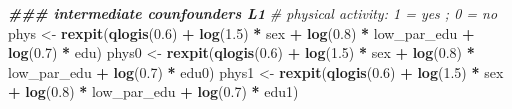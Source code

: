 \documentclass[
]{book}
\newenvironment{Shaded}{\begin{snugshade}}{\end{snugshade}}
\newcommand{\CommentTok}[1]{\textcolor[rgb]{0.56,0.35,0.01}{\textit{#1}}}
\newcommand{\DocumentationTok}[1]{\textcolor[rgb]{0.56,0.35,0.01}{\textbf{\textit{#1}}}}
\newcommand{\FloatTok}[1]{\textcolor[rgb]{0.00,0.00,0.81}{#1}}
\newcommand{\FunctionTok}[1]{\textcolor[rgb]{0.13,0.29,0.53}{\textbf{#1}}}
\newcommand{\NormalTok}[1]{#1}
\newcommand{\OtherTok}[1]{\textcolor[rgb]{0.56,0.35,0.01}{#1}}
\newcommand{\SpecialCharTok}[1]{\textcolor[rgb]{0.81,0.36,0.00}{\textbf{#1}}}
\begin{document}
\begin{Shaded}
\begin{Highlighting}[]
  \DocumentationTok{\#\#\# intermediate counfounders L1}
  \CommentTok{\# physical activity: 1 = yes ; 0 = no}
\NormalTok{  phys }\OtherTok{\textless{}{-}} \FunctionTok{rexpit}\NormalTok{(}\FunctionTok{qlogis}\NormalTok{(}\FloatTok{0.6}\NormalTok{) }\SpecialCharTok{+} \FunctionTok{log}\NormalTok{(}\FloatTok{1.5}\NormalTok{) }\SpecialCharTok{*}\NormalTok{ sex  }\SpecialCharTok{+} \FunctionTok{log}\NormalTok{(}\FloatTok{0.8}\NormalTok{) }\SpecialCharTok{*}\NormalTok{ low\_par\_edu }\SpecialCharTok{+}
                   \FunctionTok{log}\NormalTok{(}\FloatTok{0.7}\NormalTok{) }\SpecialCharTok{*}\NormalTok{ edu)}
\NormalTok{  phys0 }\OtherTok{\textless{}{-}} \FunctionTok{rexpit}\NormalTok{(}\FunctionTok{qlogis}\NormalTok{(}\FloatTok{0.6}\NormalTok{) }\SpecialCharTok{+} \FunctionTok{log}\NormalTok{(}\FloatTok{1.5}\NormalTok{) }\SpecialCharTok{*}\NormalTok{ sex  }\SpecialCharTok{+} \FunctionTok{log}\NormalTok{(}\FloatTok{0.8}\NormalTok{) }\SpecialCharTok{*}\NormalTok{ low\_par\_edu }\SpecialCharTok{+}
                    \FunctionTok{log}\NormalTok{(}\FloatTok{0.7}\NormalTok{) }\SpecialCharTok{*}\NormalTok{ edu0)}
\NormalTok{  phys1 }\OtherTok{\textless{}{-}} \FunctionTok{rexpit}\NormalTok{(}\FunctionTok{qlogis}\NormalTok{(}\FloatTok{0.6}\NormalTok{) }\SpecialCharTok{+} \FunctionTok{log}\NormalTok{(}\FloatTok{1.5}\NormalTok{) }\SpecialCharTok{*}\NormalTok{ sex  }\SpecialCharTok{+} \FunctionTok{log}\NormalTok{(}\FloatTok{0.8}\NormalTok{) }\SpecialCharTok{*}\NormalTok{ low\_par\_edu }\SpecialCharTok{+}
                    \FunctionTok{log}\NormalTok{(}\FloatTok{0.7}\NormalTok{) }\SpecialCharTok{*}\NormalTok{ edu1)}
  

\end{Highlighting}
\end{Shaded}
\end{document}
